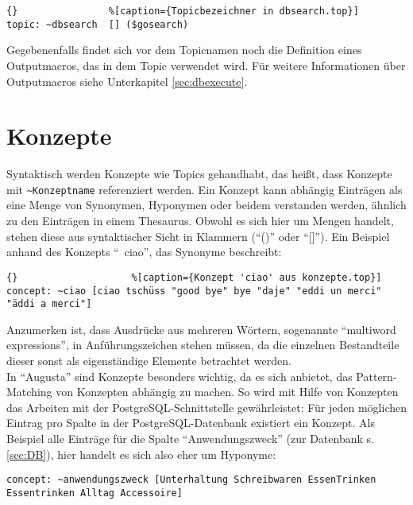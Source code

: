 \begin{lstlisting}{}				%[caption={Topicbezeichner in dbsearch.top}]
topic: ~dbsearch  [] ($gosearch)
\end{lstlisting}

Gegebenenfalls findet sich vor dem Topicnamen noch die Definition eines Outputmacros, das in dem Topic verwendet wird. Für weitere Informationen über Outputmacros siehe Unterkapitel \ref{sec:dbexecute}.\\


\section{Konzepte}
\label{sec:ChatScript: Konzepte}

Syntaktisch werden Konzepte wie Topics gehandhabt, das heißt, dass Konzepte mit \lstinline|~Konzeptname| referenziert werden. Ein Konzept kann abhängig Einträgen als eine Menge von Synonymen, Hyponymen oder beidem verstanden werden, ähnlich zu den Einträgen in einem Thesaurus. Obwohl es sich hier um Mengen handelt, stehen diese aus syntaktischer Sicht in Klammern ("`()"' oder "`[]"'). Ein Beispiel anhand des Konzepts "`~ciao"', das Synonyme beschreibt:

\begin{lstlisting}{}					%[caption={Konzept 'ciao' aus konzepte.top}]
concept: ~ciao [ciao tschüss "good bye" bye "daje" "eddi un merci" "äddi a merci"]
\end{lstlisting}

Anzumerken ist, dass Ausdrücke aus mehreren Wörtern, sogenannte "`multiword expressions"', in Anführungszeichen stehen müssen, da die einzelnen Bestandteile dieser sonst als eigenständige Elemente betrachtet werden.\\

In "`Augusta"' sind Konzepte besonders wichtig, da es sich anbietet, das Pattern-Matching von Konzepten abhängig zu machen. So wird mit Hilfe von Konzepten das Arbeiten mit der PostgreSQL-Schnittstelle gewährleistet: Für jeden möglichen Eintrag pro Spalte in der PostgreSQL-Datenbank existiert ein Konzept. Als Beispiel alle Einträge für die Spalte "`Anwendungszweck"' (zur Datenbank s. \ref{sec:DB}), hier handelt es sich also eher um Hyponyme:  

\begin{lstlisting}[caption={Konzept 'anwendungszweck' aus konzepte.top}]
concept: ~anwendungszweck [Unterhaltung Schreibwaren EssenTrinken Essentrinken Alltag Accessoire]
\end{lstlisting}

